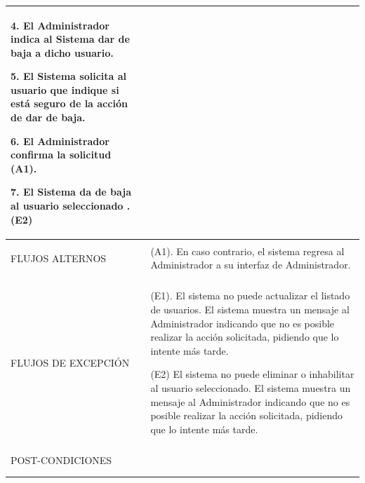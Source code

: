 \begin{longtable}{@{\extracolsep{8pt}}l p{8.5cm}}
 4. El Administrador indica al Sistema dar de baja a dicho usuario. \par\vspace{.1cm}

 5. El Sistema solicita al usuario que indique si está seguro de la acción de dar de baja. \par\vspace{.1cm}

 6. El Administrador confirma la solicitud (A1). \par\vspace{.1cm}

 7. El Sistema da de baja al usuario seleccionado .(E2) \par\vspace{.1cm}

\\
\hline \\[-1ex]

FLUJOS ALTERNOS & 
\par\vspace{.1cm} (A1). En caso contrario, el sistema regresa al Administrador a su interfaz de Administrador.



\\
\hline \\[-1ex]

FLUJOS DE EXCEPCIÓN & 
\par\vspace{.1cm} (E1). El sistema no puede actualizar el listado de usuarios. El sistema muestra un mensaje al Administrador indicando que no es posible realizar la acción solicitada, pidiendo que lo intente más tarde.

\par\vspace{.1cm} (E2) El sistema no puede eliminar o inhabilitar al usuario seleccionado. El sistema muestra un mensaje al Administrador indicando que no es posible realizar la acción solicitada, pidiendo que lo intente más tarde.


\\%

\hline \\[-1ex]
POST-CONDICIONES & 
\\
\hline 
\hline \\[-1.8ex]
 \\
\end{longtable}


\pagebreak


